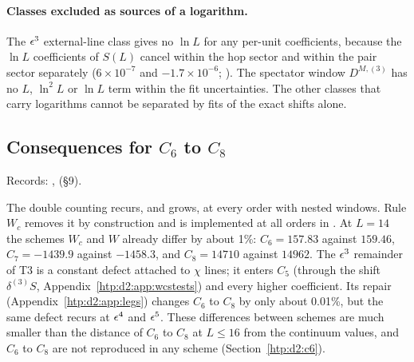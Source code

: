 \paragraph{Classes excluded as sources of a logarithm.} The $\epsilon^3$ external-line class gives no $\ln L$ for any per-unit
coefficients, because the $\ln L$ coefficients of $S(L)$ cancel within the hop sector and within the pair sector separately
($6\times10^{-7}$ and $-1.7\times10^{-6}$; ). The spectator window $D^{M,(3)}$ has no $L$, $\ln^2L$ or
$\ln L$ term within the fit uncertainties. The other classes that carry logarithms cannot be separated by fits of the exact shifts alone.

\subsection{Consequences for \texorpdfstring{$C_6$}{C6} to \texorpdfstring{$C_8$}{C8}}\label{htp:d2:app:c6eps5}
{\small\raggedright\noindent Records: , 
(\S9).\par}

The double counting recurs, and grows, at every order with nested windows. Rule $W_c$ removes it by construction and is
implemented at all orders in . At $L=14$ the schemes $W_c$ and $W$ already differ by about 1\%:
$C_6=157.83$ against $159.46$, $C_7=-1439.9$ against $-1458.3$, and $C_8=14710$ against $14962$. The $\epsilon^3$ remainder of T3
is a constant defect attached to $\chi$ lines; it enters $C_5$ (through the shift $\delta^{(3)}S$,
Appendix~\ref{htp:d2:app:wcstests}) and every higher coefficient. Its repair (Appendix~\ref{htp:d2:app:legs}) changes $C_6$ to $C_8$ by
only about 0.01\%, but the same defect recurs at $\epsilon^4$ and $\epsilon^5$. These differences between schemes are much smaller than
the distance of $C_6$ to $C_8$ at $L\le16$ from the continuum values, and $C_6$ to $C_8$ are not reproduced in any scheme
(Section~\ref{htp:d2:c6}).
